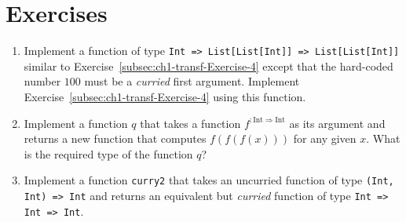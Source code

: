 \section{Exercises}
\begin{enumerate}
\item Implement a function of type \texttt{}\lstinline!Int => List[List[Int]] => List[List[Int]]!
similar to Exercise~\ref{subsec:ch1-transf-Exercise-4} except that
the hard-coded number $100$ must be a \emph{curried} first argument.
Implement Exercise~\ref{subsec:ch1-transf-Exercise-4} using this
function.
\item Implement a function $q$ that takes a function $f^{:\text{Int}\Rightarrow\text{Int}}$
as its argument and returns a new function that computes $f(f(f(x)))$
for any given $x$. What is the required type of the function $q$?
\item Implement a function \lstinline!curry2! that takes an uncurried function
of type \texttt{}\lstinline!(Int, Int) => Int! and returns an equivalent
but \emph{curried} function of type \texttt{}\lstinline!Int => Int => Int!.
\end{enumerate}

